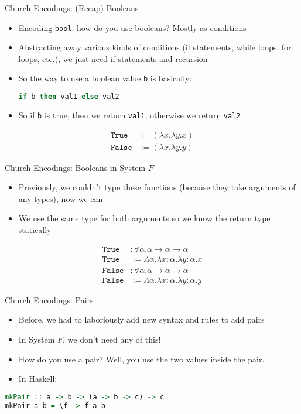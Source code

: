 \documentclass[leqno,presentation,usenames,dvipsnames]{beamer}
\begin{document}
\begin{frame}[fragile]{Church Encodings: (Recap) Booleans}
    \begin{itemize}
        \item Encoding \texttt{bool}: how do you use booleans? Mostly as conditions
        \item Abstracting away various kinds of conditions (if statements, while loops, for loops, etc.), we just need if statements and recursion
        \item So the way to use a boolean value \texttt{b} is basically:
\begin{lstlisting}[language=haskell, basicstyle=\small\ttfamily]
if b then val1 else val2
\end{lstlisting}
        \item So if \texttt{b} is true, then we return \texttt{val1}, otherwise we return \texttt{val2}
    \end{itemize}
\begin{align*}
    \texttt{True} & := (\lambda x. \lambda y. x) \\
    \texttt{False} & := (\lambda x. \lambda y. y)
\end{align*}
\end{frame}

\begin{frame}[fragile]{Church Encodings: Booleans in System $F$}
    \begin{itemize}
        \item Previously, we couldn't type these functions (because they take arguments of any types), now we can
        \item We use the same type for both arguments so we know the return type statically
    \end{itemize}
\begin{align*}
    \texttt{True} & : \forall \alpha. \alpha \to \alpha \to \alpha \\
    \texttt{True} & := \Lambda \alpha. \lambda x : \alpha. \lambda y : \alpha. x \\
    \texttt{False} & : \forall \alpha. \alpha \to \alpha \to \alpha \\
    \texttt{False} & := \Lambda \alpha. \lambda x : \alpha. \lambda y : \alpha. y
\end{align*}
\end{frame}

\begin{frame}[fragile]{Church Encodings: Pairs}
    \begin{itemize}
        \item Before, we had to laboriously add new syntax and rules to add pairs
        \item In System $F$, we don't need any of this!
        \item How do you use a pair? Well, you use the two values inside the pair.
        \item In Haskell:
    \end{itemize}
\begin{lstlisting}[language=haskell, basicstyle=\small\ttfamily]
mkPair :: a -> b -> (a -> b -> c) -> c
mkPair a b = \f -> f a b
\end{lstlisting}
\end{frame}
\end{document}
